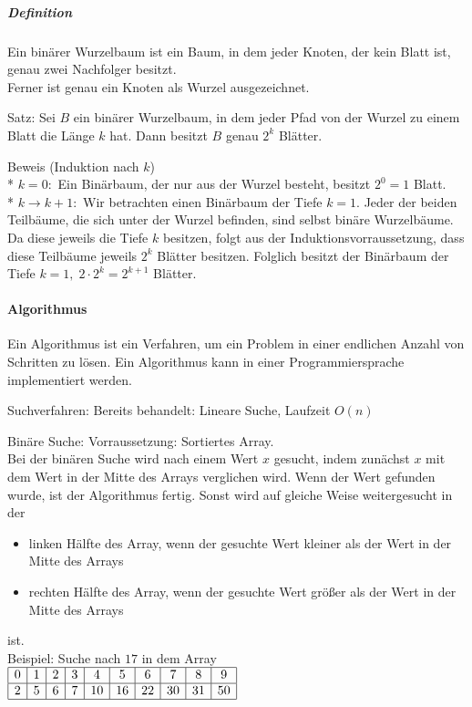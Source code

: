 \documentclass[a4paper]{scrartcl}
\begin{document}
\subparagraph{Definition} Ein binärer Wurzelbaum ist ein Baum, in dem jeder Knoten, der kein Blatt ist, genau zwei Nachfolger besitzt.\\
Ferner ist genau ein Knoten als Wurzel ausgezeichnet.

 
Satz: Sei $B$ ein binärer Wurzelbaum, in dem jeder Pfad von der Wurzel zu einem Blatt die Länge $k$ hat. Dann besitzt $B$ genau $2^k$ Blätter.

Beweis (Induktion nach $k$)\\*
$k=0:$ Ein Binärbaum, der nur aus der Wurzel besteht, besitzt $2^0=1$ Blatt.\\*
$k \rightarrow k+1:$ Wir betrachten einen Binärbaum der Tiefe $k=1$. Jeder der beiden Teilbäume, die sich unter der Wurzel befinden, sind selbst binäre Wurzelbäume.
Da diese jeweils die Tiefe $k$ besitzen, folgt aus der Induktionsvorraussetzung, dass diese Teilbäume jeweils $2^k$ Blätter besitzen. Folglich besitzt der Binärbaum der Tiefe $k=1, \; 2 \cdot 2^k = 2^{k+1}$ Blätter.

\paragraph{Algorithmus}
Ein Algorithmus ist ein Verfahren, um ein Problem in einer endlichen Anzahl von Schritten zu lösen. Ein Algorithmus kann in einer Programmiersprache implementiert werden.

Suchverfahren: Bereits behandelt: Lineare Suche, Laufzeit $O(n)$

Binäre Suche: Vorraussetzung: Sortiertes Array.\\
Bei der binären Suche wird nach einem Wert $x$ gesucht, indem zunächst $x$ mit dem Wert in der Mitte des Arrays verglichen wird. Wenn der Wert gefunden wurde, ist der Algorithmus fertig. Sonst wird auf gleiche Weise weitergesucht in der 
\begin{itemize}
\item linken Hälfte des Array, wenn der gesuchte Wert kleiner als der Wert in der Mitte des Arrays
\item rechten Hälfte des Array, wenn der gesuchte Wert größer als der Wert in der Mitte des Arrays
\end{itemize}
ist.\\
Beispiel: Suche nach $17$ in dem Array\\
$
\begin{array}{|c|c|c|c|c|c|c|c|c|c|}
\hline
0 & 1 & 2 & 3 & 4 & 5 & 6 & 7 & 8 & 9\\ \hline
2 & 5 & 6 & 7 & 10 & 16 & 22 & 30 & 31 & 50\\
\hline
\end{array}$
\end{document}
